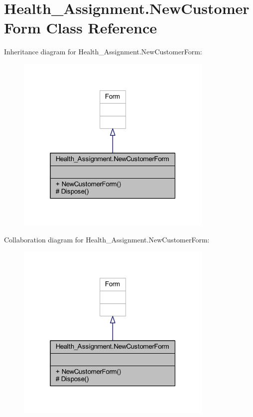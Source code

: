 \hypertarget{class_health___assignment_1_1_new_customer_form}{}\section{Health\+\_\+\+Assignment.\+New\+Customer\+Form Class Reference}
\label{class_health___assignment_1_1_new_customer_form}


Inheritance diagram for Health\+\_\+\+Assignment.\+New\+Customer\+Form\+:\nopagebreak
\begin{figure}[H]
\begin{center}
\leavevmode
\includegraphics[width=268pt]{class_health___assignment_1_1_new_customer_form__inherit__graph}
\end{center}
\end{figure}


Collaboration diagram for Health\+\_\+\+Assignment.\+New\+Customer\+Form\+:\nopagebreak
\begin{figure}[H]
\begin{center}
\leavevmode
\includegraphics[width=268pt]{class_health___assignment_1_1_new_customer_form__coll__graph}
\end{center}
\end{figure}
